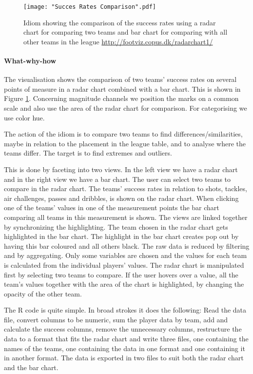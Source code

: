 \documentclass[Report.tex]{subfiles}
\begin{document}
\begin{figure}
\center
\texttt{[image: "Succes Rates Comparison".pdf]}
\caption{Idiom showing the comparison of the success rates using a radar chart for comparing two teams and bar chart for comparing with all other teams in the league \url{http://footviz.copus.dk/radarchart1/}}
\label{Fig:SuccesRates}
\end{figure}

\paragraph{What-why-how\\}
The visualisation shows the comparison of two teams' success rates on several points of measure in a radar chart combined with a bar chart. This is shown in Figure \ref{Fig:SuccesRates}. Concerning magnitude channels we position the marks on a common scale and also use the area of the radar chart for comparison. For categorising we use color hue.

The action of the idiom is to compare two teams to find differences/similarities, maybe in relation to the placement in the league table, and to analyse where the teams differ. The target is to find extremes and outliers.

This is done by faceting into two views. In the left view we have a radar chart and in the right view we have a bar chart. The user can select two teams to compare in the radar chart. The teams' success rates in relation to shots, tackles, air challenges, passes and dribbles, is shown on the radar chart. When clicking one of the teams' values in one of the measurement points the bar chart comparing all teams in this measurement is shown. The views are linked together by synchronizing the highlighting. The team chosen in the radar chart gets highlighted in the bar chart. The highlight in the bar chart creates pop out by having this bar coloured and all others black.
The raw data is reduced by filtering and by aggregating. Only some variables are chosen and the values for each team is calculated from the individual players' values. 
The radar chart is manipulated first by selecting two teams to compare. If the user hovers over a value, all the team's values together with the area of the chart is highlighted, by changing the opacity of the other team.

The R code is quite simple. In broad strokes it does the following: Read the data file, convert columns to be numeric, sum the player data by team, add and calculate the success columns, remove the unnecessary columns, restructure the data to a format that fits the radar chart and write three files, one containing the names of the teams, one containing the data in one format and one containing it in another format. The data is exported in two files to suit both the radar chart and the bar chart.
\end{document}
